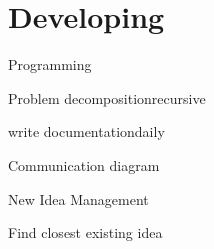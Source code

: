 
\section{Developing}
\begin{checklist}{Programming}
  \item{Problem decomposition}{recursive}
  \item{write documentation}{daily}
  \item{Communication diagram}{}
\end{checklist}

\begin{checklist}{New Idea Management}
  \item{Find closest existing idea}{} 
\end{checklist}

